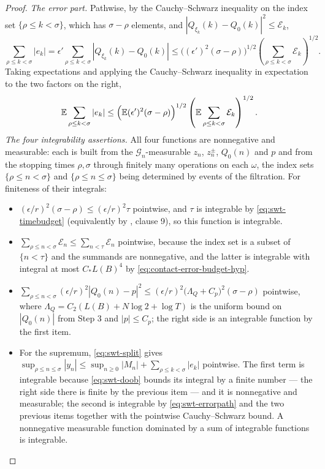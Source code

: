 \begin{proof}
\emph{The error part.} Pathwise, by the Cauchy--Schwarz inequality on the index
set $\{\rho\le k<\sigma\}$, which has $\sigma-\rho$ elements, and
$|Q_{\xi_k}(k)-Q_0(k)|^2\le\mathcal E_k$,
\begin{equation}\label{eq:swt-errorpath}
  \sum_{\rho\le k<\sigma}|e_k|
   =\epsilon'\sum_{\rho\le k<\sigma}|Q_{\xi_k}(k)-Q_0(k)|
   \le\bigl((\epsilon')^2(\sigma-\rho)\bigr)^{1/2}
      \left(\sum_{\rho\le k<\sigma}\mathcal E_k\right)^{1/2}.
\end{equation}
Taking expectations and applying the Cauchy--Schwarz inequality in expectation
to the two factors on the right,
\begin{equation}\label{eq:swt-error}
  \mathbb E\sum_{\rho\le k<\sigma}|e_k|
   \le\Bigl(\mathbb E(\epsilon')^2(\sigma-\rho)\Bigr)^{1/2}
      \left(\mathbb E\sum_{\rho\le k<\sigma}\mathcal E_k\right)^{1/2}.
\end{equation}
\emph{The four integrability assertions.} All four functions are nonnegative
and measurable: each is built from the $\mathcal G_n$-measurable $z_n$,
$z^\pm_n$, $Q_0(n)$ and $p$ and from the stopping times $\rho,\sigma$ through
finitely many operations on each $\omega$, the index sets
$\{\rho\le n<\sigma\}$ and $\{\rho\le n\le\sigma\}$ being determined by events
of the filtration. For finiteness of their integrals:
\begin{itemize}
\item $(\epsilon/r)^2(\sigma-\rho)\le(\epsilon/r)^2\tau$ pointwise, and $\tau$
is integrable by \eqref{eq:swt-timebudget} (equivalently by
, clause 9), so this function is integrable.
\item $\sum_{\rho\le n<\sigma}\mathcal E_n\le\sum_{n<\tau}\mathcal E_n$
pointwise, because the index set is a subset of $\{n<\tau\}$ and the summands
are nonnegative, and the latter is integrable with integral at most
$C_*L(B)^4$ by \eqref{eq:contact-error-budget-hyp}.
\item $\sum_{\rho\le n<\sigma}(\epsilon/r)^2|Q_0(n)-p|^2
  \le(\epsilon/r)^2\bigl(\Lambda_Q+C_p\bigr)^2(\sigma-\rho)$ pointwise, where
$\Lambda_Q=C_2(L(B)+N\log2+\log T)$ is the uniform bound on $|Q_0(n)|$ from
Step 3 and $|p|\le C_p$; the right side is an integrable function by the first
item.
\item For the supremum, \eqref{eq:swt-split} gives
$\sup_{\rho\le n\le\sigma}|y_n|\le\sup_{n\ge0}|M_n|
  +\sum_{\rho\le k<\sigma}|e_k|$ pointwise. The first term is integrable
because \eqref{eq:swt-doob} bounds its integral by a finite number --- the
right side there is finite by the previous item --- and it is nonnegative and
measurable; the second is integrable by \eqref{eq:swt-errorpath} and the two
previous items together with the pointwise Cauchy--Schwarz bound. A nonnegative
measurable function dominated by a sum of integrable functions is integrable.
\end{itemize}


\end{proof}
